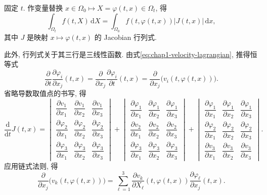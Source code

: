 \begin{Proof}
固定 $t$. 作变量替换 $x\in\Omega_0\mapsto X=\varphi(t,x)\in\Omega_t$, 得
\[
  \int_{\Omega_t} f(t,X)\,\mathrm{d}X
  =\int_{\Omega_0} f(t,\varphi(t,x))\lvert J(t,x)\rvert\,\mathrm{d}x,
\]
其中 $J$ 是映射 $x\mapsto\varphi(t,x)$ 的 Jacobian 行列式.

此外, 行列式关于其三行是三线性函数. 由式\eqref{eq:chap1-velocity-lagrangian}, 推得恒等式
\[
  \frac{\partial}{\partial t}\frac{\partial\varphi_i}{\partial x_j}(t,x)
  =\frac{\partial}{\partial x_j}\frac{\partial\varphi_i}{\partial t}(t,x)
  =\frac{\partial}{\partial x_j}\bigl(v_i(t,\varphi(t,x))\bigr).
\]
省略导数取值点的书写, 得
\[
\frac{\mathrm{d}}{\mathrm{d}t}J(t,x)=
\begin{vmatrix}
\dfrac{\partial v_1}{\partial x_1}&\dfrac{\partial v_1}{\partial x_2}&\dfrac{\partial v_1}{\partial x_3}\\
\dfrac{\partial\varphi_2}{\partial x_1}&\dfrac{\partial\varphi_2}{\partial x_2}&\dfrac{\partial\varphi_2}{\partial x_3}\\
\dfrac{\partial\varphi_3}{\partial x_1}&\dfrac{\partial\varphi_3}{\partial x_2}&\dfrac{\partial\varphi_3}{\partial x_3}
\end{vmatrix}
+
\begin{vmatrix}
\dfrac{\partial\varphi_1}{\partial x_1}&\dfrac{\partial\varphi_1}{\partial x_2}&\dfrac{\partial\varphi_1}{\partial x_3}\\
\dfrac{\partial v_2}{\partial x_1}&\dfrac{\partial v_2}{\partial x_2}&\dfrac{\partial v_2}{\partial x_3}\\
\dfrac{\partial\varphi_3}{\partial x_1}&\dfrac{\partial\varphi_3}{\partial x_2}&\dfrac{\partial\varphi_3}{\partial x_3}
\end{vmatrix}
+
\begin{vmatrix}
\dfrac{\partial\varphi_1}{\partial x_1}&\dfrac{\partial\varphi_1}{\partial x_2}&\dfrac{\partial\varphi_1}{\partial x_3}\\
\dfrac{\partial\varphi_2}{\partial x_1}&\dfrac{\partial\varphi_2}{\partial x_2}&\dfrac{\partial\varphi_2}{\partial x_3}\\
\dfrac{\partial v_3}{\partial x_1}&\dfrac{\partial v_3}{\partial x_2}&\dfrac{\partial v_3}{\partial x_3}
\end{vmatrix}.
\]
应用链式法则, 得
\begin{equation}
\label{eq:chap1-transport-chain-rule}
  \frac{\partial}{\partial x_j}\bigl(v_k(t,\varphi(t,x))\bigr)
  =\sum_{\ell=1}^{3}\frac{\partial v_k}{\partial X_\ell}(t,\varphi(t,x))
  \frac{\partial\varphi_\ell}{\partial x_j}(t,x).
\end{equation}


\end{Proof}
